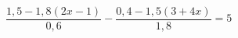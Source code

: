 \begin{ex}[type=equation]
	\begin{condition}
		$\dfrac{1,5 - 1,8(2x - 1)}{0,6} - \dfrac{0,4- 1,5(3+4x)}{1,8} = 5$
	\end{condition}
\end{ex}